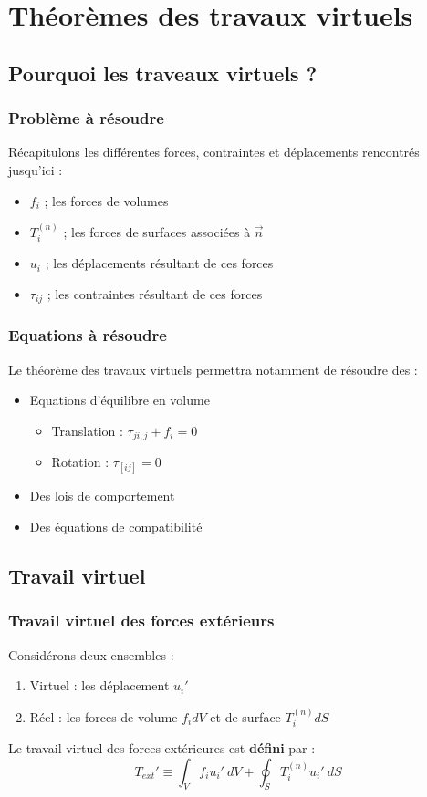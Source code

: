 \chapter{Théorèmes des travaux virtuels}
\section{Pourquoi les traveaux virtuels ?}
	\subsection{Problème à résoudre}
	Récapitulons les différentes forces, contraintes et déplacements rencontrés
	jusqu'ici :
	\begin{itemize}
	\item $f_i$ ; les forces de volumes
	\item $T_i^{(n)}$ ; les forces de surfaces associées à $\vec{n}$
	\item $u_i$ ; les déplacements résultant de ces forces
	\item $\tau_{ij}$ ; les contraintes résultant de ces forces	
	\end{itemize}
	
	\subsection{Equations à résoudre}
	Le théorème des travaux virtuels permettra notamment de résoudre des :
	\begin{itemize}
	\item Equations d'équilibre en volume 
		\begin{itemize}
		\item Translation : $\tau_{ji,j} + f_i = 0$
		\item Rotation : $\tau_{[ij]} = 0$
		\end{itemize}
	\item Des lois de comportement
	\item Des équations de compatibilité
	\end{itemize}
	
\section{Travail virtuel}
	\subsection{Travail virtuel des forces extérieurs}
	Considérons deux ensembles : 
	\begin{enumerate}
	\item Virtuel : les déplacement $u_i'$
	\item Réel : les forces de volume $f_idV$ et de surface $T_i^{(n)}dS$
	\end{enumerate}
	Le travail virtuel des forces extérieures est \textbf{défini} par :
	\begin{equation}
	T_{ext}' \equiv \int_V f_iu_i'\ dV + \oint_S T_i^{(n)}u_i'\ dS
	\end{equation}
	
